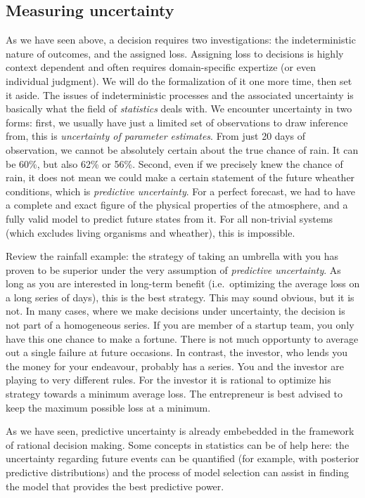 \documentclass[]{svmono}
\begin{document}
\subsection{Measuring uncertainty}\label{measuring-uncertainty}

As we have seen above, a decision requires two investigations: the
indeterministic nature of outcomes, and the assigned loss. Assigning
loss to decisions is highly context dependent and often requires
domain-specific expertize (or even individual judgment). We will do the
formalization of it one more time, then set it aside. The issues of
indeterministic processes and the associated uncertainty is basically
what the field of \emph{statistics} deals with. We encounter uncertainty
in two forms: first, we usually have just a limited set of observations
to draw inference from, this is \emph{uncertainty of parameter
estimates}. From just 20 days of observation, we cannot be absolutely
certain about the true chance of rain. It can be 60\%, but also 62\% or
56\%. Second, even if we precisely knew the chance of rain, it does not
mean we could make a certain statement of the future wheather
conditions, which is \emph{predictive uncertainty}. For a perfect
forecast, we had to have a complete and exact figure of the physical
properties of the atmosphere, and a fully valid model to predict future
states from it. For all non-trivial systems (which excludes living
organisms and wheather), this is impossible.

Review the rainfall example: the strategy of taking an umbrella with you
has proven to be superior under the very assumption of \emph{predictive
uncertainty}. As long as you are interested in long-term benefit
(i.e.~optimizing the average loss on a long series of days), this is the
best strategy. This may sound obvious, but it is not. In many cases,
where we make decisions under uncertainty, the decision is not part of a
homogeneous series. If you are member of a startup team, you only have
this one chance to make a fortune. There is not much opportunty to
average out a single failure at future occasions. In contrast, the
investor, who lends you the money for your endeavour, probably has a
series. You and the investor are playing to very different rules. For
the investor it is rational to optimize his strategy towards a minimum
average loss. The entrepreneur is best advised to keep the maximum
possible loss at a minimum.

As we have seen, predictive uncertainty is already embebedded in the
framework of rational decision making. Some concepts in statistics can
be of help here: the uncertainty regarding future events can be
quantified (for example, with posterior predictive distributions) and
the process of model selection can assist in finding the model that
provides the best predictive power.
\end{document}
